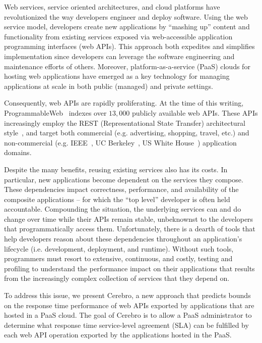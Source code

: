Web services, service oriented architectures, and cloud platforms have
revolutionized the way developers engineer and deploy software.
Using the web service model, developers create new applications
by ``mashing up'' content and functionality 
from existing services 
exposed via web-accessible application programming interfaces (web APIs).
This approach both expedites and simplifies implementation since 
developers can leverage the 
software engineering and maintenance efforts of others.
Moreover, platform-as-a-service (PaaS) clouds
for hosting web applications have emerged as a key
technology for managing applications at scale in both public (managed) and 
private settings.  

Consequently, web APIs are rapidly 
proliferating.  At the time of this writing, 
ProgrammableWeb~\cite{pweb} indexes over $13,000$
publicly available web APIs.
These APIs increasingly employ the REST (Representational State Transfer) 
architectural style~\cite{Fielding:2000:ASD:932295}, and target both
commercial (e.g. advertising, shopping, travel, etc.) and non-commercial
(e.g. IEEE~\cite{ieeeapis}, UC Berkeley~\cite{ucbapis}, US White
House~\cite{whitehouseapis}) application domains.

Despite the many benefits, reusing existing services also has its costs.  
In particular, new applications become dependent on the 
services they compose.  These dependencies
impact correctness, performance, and availability of the composite 
applications -- for which the ``top level'' developer is often held accountable.  
Compounding the situation, the underlying services can and do change over time
while their APIs remain stable,
unbeknownst to the developers that programmatically access them.
Unfortunately, there is a dearth of tools that help developers reason about these 
dependencies throughout an application's 
lifecycle (i.e. development, deployment, and runtime).  Without such tools, 
programmers must resort to extensive, continuous, and costly, testing and profiling 
to understand the performance impact on their applications
that results from the increasingly complex collection of
services that they depend on.

To address this issue, we present Cerebro, a new approach that
predicts bounds on 
the response time performance of web
APIs exported by applications that are hosted in a PaaS cloud.
The goal of Cerebro is to allow 
a PaaS administrator to determine what response time service-level agreement (SLA) can be
fulfilled by each web API operation exported by the applications
hosted in the PaaS.  

